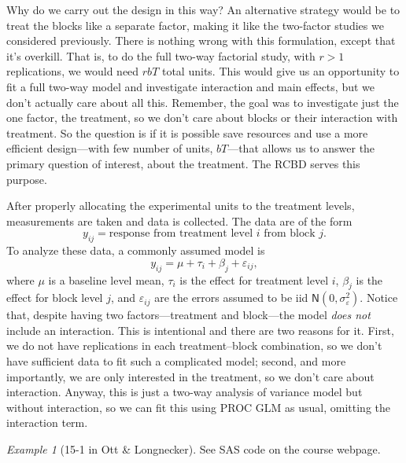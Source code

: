 \documentclass[a4paper, 12pt]{article}
\theoremstyle{plain}
\theoremstyle{definition}
\theoremstyle{remark}
\newtheorem*{example}{Example}
\newcommand{\eps}{\varepsilon}
\newcommand{\nm}{\mathsf{N}}
\begin{document}
Why do we carry out the design in this way?  An alternative strategy would be to treat the blocks like a separate factor, making it like the two-factor studies we considered previously.  There is nothing wrong with this formulation, except that it's overkill.  That is, to do the full two-way factorial study, with $r > 1$ replications, we would need $rbT$ total units.  This would give us an opportunity to fit a full two-way model and investigate interaction and main effects, but we don't actually care about all this.  Remember, the goal was to investigate just the one factor, the treatment, so we don't care about blocks or their interaction with treatment.  So the question is if it is possible save resources and use a more efficient design---with few number of units, $bT$---that allows us to answer the primary question of interest, about the treatment.  The RCBD serves this purpose.  

After properly allocating the experimental units to the treatment levels, measurements are taken and data is collected.  The data are of the form 
\[ y_{ij} = \text{response from treatment level $i$ from block $j$}. \]
To analyze these data, a commonly assumed model is 
\[ y_{ij} = \mu + \tau_i + \beta_j + \eps_{ij}, \]
where $\mu$ is a baseline level mean, $\tau_i$ is the effect for treatment level $i$, $\beta_j$ is the effect for block level $j$, and $\eps_{ij}$ are the errors assumed to be iid $\nm(0,\sigma_\eps^2)$.  Notice that, despite having two factors---treatment and block---the model {\em does not} include an interaction.  This is intentional and there are two reasons for it.  First, we do not have replications in each treatment--block combination, so we don't have sufficient data to fit such a complicated model; second, and more importantly, we are only interested in the treatment, so we don't care about interaction.  Anyway, this is just a two-way analysis of variance model but without interaction, so we can fit this using PROC GLM as usual, omitting the interaction term.  

\begin{example}[15-1 in Ott \& Longnecker]
See SAS code on the course webpage.
\end{example}
\end{document}
